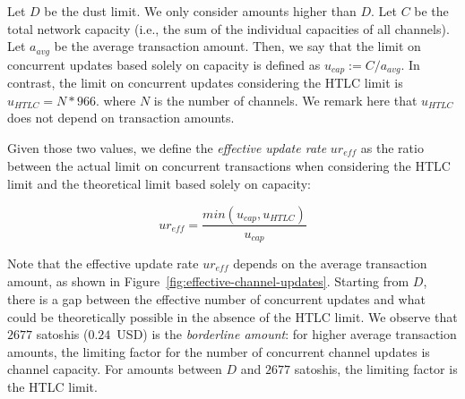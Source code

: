 

Let $D$ be the dust limit.
We only consider amounts higher than $D$.
Let $C$ be the total network capacity (i.e., the sum of the individual capacities of all channels).
Let $a_\textit{avg}$ be the average transaction amount. 
Then, we say that the limit on concurrent updates based solely on capacity is defined as   
$u_\textit{cap} := C / a_\textit{avg}$.
In contrast, the limit on concurrent updates 
considering the HTLC limit is $u_\textit{HTLC} = N * 966$.
where $N$ is the number of channels. We remark here that $u_\textit{HTLC}$ does not depend on transaction amounts.

Given those two values, we define the 
\textit{effective update rate} $ur_\textit{eff}$ as the ratio between the actual limit on concurrent 
transactions when considering the HTLC limit and the theoretical 
limit based solely on capacity:

\[ur_\textit{eff} = \frac{min(u_\textit{cap}, u_\textit{HTLC})}{u_\textit{cap}}\]

Note that the effective update rate $ur_\textit{eff}$ depends on 
the average transaction amount, as shown in Figure~\ref{fig:effective-channel-updates}.
Starting from $D$, there is a gap between the effective number of concurrent updates and what could be theoretically possible in the absence of the HTLC limit. 
We observe that $2677$ satoshis ($0.24$~USD) is the \textit{borderline amount}: for higher average transaction amounts, 
the limiting factor for the number of concurrent channel updates is channel capacity.
For amounts between $D$ and $2677$ satoshis, the limiting factor is the HTLC limit.

